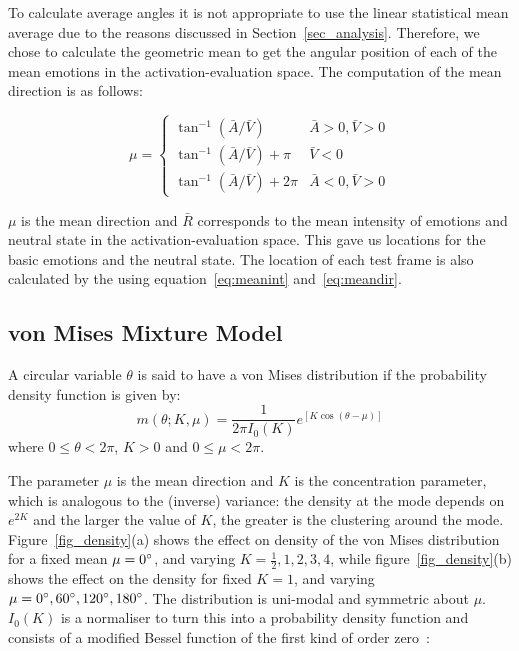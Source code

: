\documentclass[10pt,journal,cspaper,compsoc]{IEEEtran}
\begin{document}
To calculate average angles it is not appropriate to use the linear statistical mean average due to the reasons discussed in Section~\ref{sec_analysis}. Therefore, we chose to calculate the geometric mean to get the angular position of each of the mean emotions in the activation-evaluation space. The computation of the mean direction is as follows:

\begin{equation}
\label{eq:meandir}
\mu= \left\{ \begin{array}{ll}
\tan^{-1}(\bar{A}/\bar{V}) & \bar{A}>0, \bar{V}>0 \\ 
\tan^{-1}(\bar{A}/\bar{V})+\pi & \bar{V}<0 \\ 
\tan^{-1}(\bar{A}/\bar{V})+2\pi & \bar{A}<0, \bar{V}>0
\end{array}\right.
\end{equation}

$\mu$ is the mean direction and $\bar{R}$ corresponds to the mean intensity of emotions and neutral state in the activation-evaluation space. This gave us locations for the basic emotions and the neutral state. The location of each test frame is also calculated by the using equation~\ref{eq:meanint} and~\ref{eq:meandir}.

\subsection{von Mises Mixture Model}
\label{sec_von_Mises}

A circular variable $\theta$ is said to have a von Mises distribution if the probability density function is given by:
\begin{equation}
m(\theta;K,\mu) = \frac {1}{2 \pi I_{0} (K)} e^{[K\cos (\theta - \mu)]}
\end{equation}
where $0 \leq \theta < 2 \pi$, $K > 0$ and $0\leq\mu<2\pi$.

The parameter $\mu$ is the mean direction and $K$ is the concentration parameter, which is analogous to the (inverse) variance: the density at the mode depends on $e^{2K}$ and the larger the value of $K$, the greater is the clustering around the mode. Figure~\ref{fig_density}(a) shows the effect on density of the von Mises distribution for a fixed mean $\mu=0\degree$, and varying $K=\frac{1}{2}, 1, 2, 3, 4$, while figure~\ref{fig_density}(b) shows the effect on the density for fixed $K=1$, and varying $\mu=0\degree, 60\degree, 120\degree, 180\degree$. The distribution is uni-modal and symmetric about $\mu$. $I_{0}(K)$ is a normaliser to turn this into a probability density function and consists of a modified Bessel function of the first kind of order zero~\cite{chang1996computation}:
\end{document}
